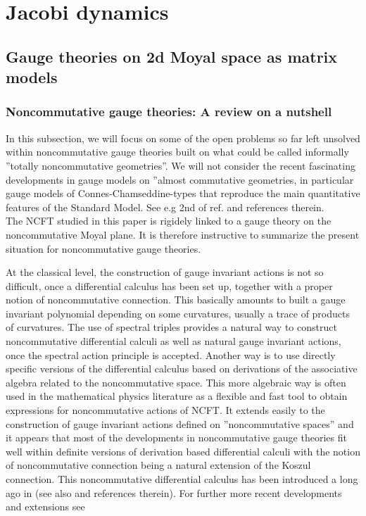\documentclass[10pt]{book}
\theoremstyle{break}
\begin{document}
\chapter{Jacobi dynamics}



\section{Gauge theories on 2d Moyal space as matrix models}


\subsection{Noncommutative gauge theories: A review on a nutshell}

In this subsection, we will focus on some of the open problems so far left unsolved within noncommutative gauge theories built on what could be called informally  ''totally noncommutative geometries''. We will not consider the recent fascinating developments in gauge models on ''almost commutative geometries, in particular gauge models of Connes-Chamseddine-types that reproduce the main quantitative features of the Standard Model. See e.g 2nd of ref. %
and references therein. \\
The NCFT studied in this paper is rigidely linked to a gauge theory on the noncommutative Moyal plane. It is therefore instructive to summarize the present situation for noncommutative gauge theories.\par
At the classical level, the construction of gauge invariant actions is not so difficult, once a differential calculus has been set up, together with a proper notion of noncommutative connection. This basically amounts to built a gauge invariant polynomial depending on some curvatures, usually a trace of products of curvatures. The use of spectral triples provides a natural way to construct noncommutative differential calculi as well as natural gauge invariant actions, once the spectral action principle is accepted. Another way is to use directly specific versions of the differential calculus based on derivations of the associative algebra related to the noncommutative space. This more algebraic way is often used in the mathematical physics literature as a flexible and fast tool to obtain expressions for noncommutative actions of NCFT. It extends easily to the construction of gauge invariant actions defined on ''noncommutative spaces'' and it appears that most of the developments in noncommutative gauge 
theories fit well within definite versions of derivation based differential calculi with the notion of noncommutative connection being a natural extension of the Koszul connection. This noncommutative differential calculus has been introduced a long ago in %
(see also %
and references therein). For further more recent developments and extensions see %
\end{document}
